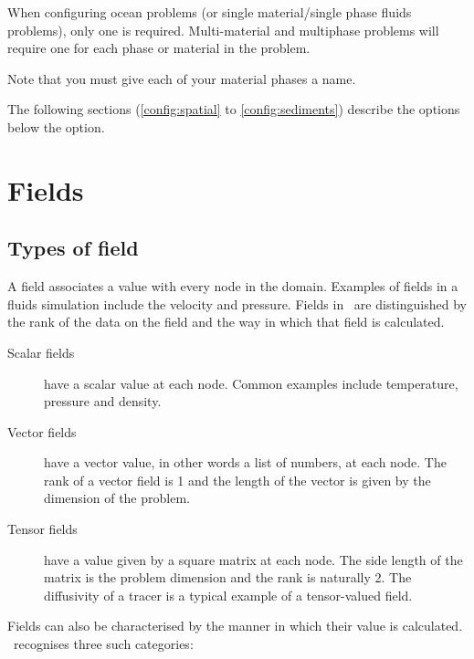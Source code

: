 When configuring ocean problems (or single material/single phase fluids
problems), only one  is required.  Multi-material
and multiphase problems will require one  for each
phase or material in the problem.

Note that you must give each of your material phases a name.

The following sections (\ref{config:spatial} to \ref{config:sediments}) describe the options below the
 option.

\section{Fields}
\subsection{Types of field}

A field associates a value with every node in the domain. Examples of fields
in a fluids simulation include the velocity and pressure. Fields in \fluidity\
are distinguished by the rank of the data on the field and the way in which
that field is calculated. 

\begin{description}
\item[Scalar fields] have a scalar value at each node. Common examples
  include temperature, pressure and density.
\item[Vector fields] have a vector value, in other words a list of numbers,
  at each node. The rank of a vector field is 1 and the length of the
  vector is given by the dimension of the problem.
\item[Tensor fields] have a value given by a square matrix at each
  node. The side length of the matrix is the problem dimension and the rank
  is naturally 2. The diffusivity of a tracer is a typical example of a
  tensor-valued field.
\end{description}

Fields can also be characterised by the manner in which their value is
calculated. \fluidity\ recognises three such categories:

